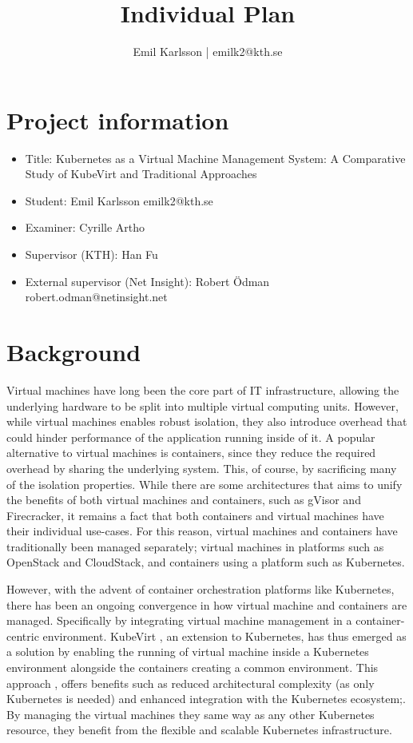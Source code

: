 \documentclass{article}
\title{Individual Plan}
\author{Emil Karlsson | emilk2@kth.se}
\begin{document}
\maketitle

\section{Project information}
\begin{itemize}
    \item Title: Kubernetes as a Virtual Machine Management System: A Comparative Study of KubeVirt and Traditional Approaches
    \item Student: Emil Karlsson emilk2@kth.se
    \item Examiner: Cyrille Artho
    \item Supervisor (KTH): Han Fu
    \item External supervisor (Net Insight): Robert Ödman robert.odman@netinsight.net
\end{itemize}

\section{Background}
Virtual machines \cite{Li2023} have long been the core part of IT infrastructure, allowing the underlying hardware to be split into multiple virtual computing units. However, while virtual machines enables robust isolation, they also introduce overhead that could hinder performance of the application running inside of it. A popular alternative to virtual machines is containers, since they reduce the required overhead by sharing the underlying system. This, of course, by sacrificing many of the isolation properties. While there are some architectures that aims to unify the benefits of both virtual machines and containers, such as gVisor and Firecracker, it remains a fact that both containers and virtual machines have their individual use-cases. For this reason, virtual machines and containers have traditionally been managed separately; virtual machines in platforms such as OpenStack and CloudStack, and containers using a platform such as Kubernetes. 

However, with the advent of container orchestration platforms like Kubernetes, there has been an ongoing convergence \cite{Li2023} in how virtual machine and containers are managed. Specifically by integrating virtual machine management in a container-centric environment. KubeVirt \cite{kubevirt}, an extension to Kubernetes, has thus emerged as a solution by enabling the running of virtual machine inside a Kubernetes environment alongside the containers creating a common environment. This approach \cite{kubevirt-cncf}, offers benefits such as reduced architectural complexity (as only Kubernetes is needed) and enhanced integration with the Kubernetes ecosystem;. By managing the virtual machines they same way as any other Kubernetes resource, they benefit from the flexible and scalable Kubernetes infrastructure. 
\end{document}
